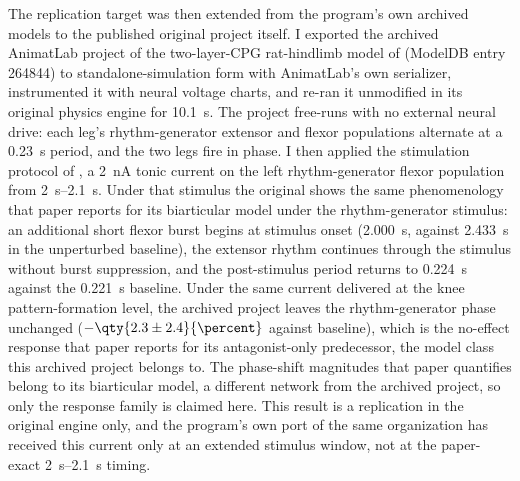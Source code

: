 
The replication target was then extended from the program's own archived models to the published original project itself. I exported the archived AnimatLab project of the two-layer-CPG rat-hindlimb model of \citet{deng_neuromechanical_2019} (ModelDB entry 264844) to standalone-simulation form with AnimatLab's own serializer, instrumented it with neural voltage charts, and re-ran it unmodified in its original physics engine for \qty{10.1}{\second}. The project free-runs with no external neural drive: each leg's rhythm-generator extensor and flexor populations alternate at a \qty{0.23}{\second} period, and the two legs fire in phase. I then applied the stimulation protocol of \citet{deng_biarticular_2023}, a \qty{2}{\nano\ampere} tonic current on the left rhythm-generator flexor population from \SIrange{2}{2.1}{\second}. Under that stimulus the original shows the same phenomenology that paper reports for its biarticular model under the rhythm-generator stimulus: an additional short flexor burst begins at stimulus onset (\qty{2.000}{\second}, against \qty{2.433}{\second} in the unperturbed baseline), the extensor rhythm continues through the stimulus without burst suppression, and the post-stimulus period returns to \qty{0.224}{\second} against the \qty{0.221}{\second} baseline. Under the same current delivered at the knee pattern-formation level, the archived project leaves the rhythm-generator phase unchanged ($-\qty{2.3 \pm 2.4}{\percent}$ against baseline), which is the no-effect response that paper reports for its antagonist-only predecessor, the model class this archived project belongs to. The phase-shift magnitudes that paper quantifies belong to its biarticular model, a different network from the archived project, so only the response family is claimed here. This result is a replication in the original engine only, and the program's own port of the same organization has received this current only at an extended stimulus window, not at the paper-exact \SIrange{2}{2.1}{\second} timing.
